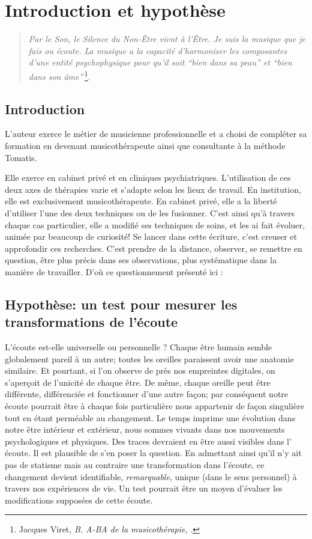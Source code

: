 \chapter{Introduction et hypothèse}
\begin{quotation}
\emph{Par le Son, le Silence du Non-Être vient à l'Être. Je suis
la musique que je fais ou écoute. La musique a la capacité d'harmoniser
les composantes d'une entité psychophysique pour qu'il soit ``bien
dans sa peau'' et ``bien dans son âme''}\,\footnote{Jacques Viret, \emph{B. A-BA de la musicothérapie}, \cite{Viret2007}.}.
\end{quotation}

\section{Introduction}

L'auteur exerce le métier de musicienne professionnelle et a  choisi de compléter sa formation en devenant musicothérapeute  ainsi que consultante à la méthode Tomatis.  



Elle exerce en cabinet privé et en cliniques psychiatriques. L'utilisation de ces deux axes de thérapies varie et s'adapte selon les lieux de travail. En institution, elle est exclusivement musicothérapeute. En cabinet
privé, elle a la liberté d'utiliser l'une des deux techniques ou de les fusionner.
C'est ainsi qu'à travers chaque cas particulier,
elle a modifié ses techniques de soins, et les ai fait évoluer, animée par beaucoup de curiosité! Se lancer dans cette écriture, c'est creuser et approfondir ces recherches. C'est prendre de la distance, observer, se remettre en question, être plus précis dans ses observations, plus systématique dans la manière de travailler. D'où ce questionnement présenté ici : 


\section{Hypothèse: un test pour mesurer les transformations de l'écoute}

L'écoute est-elle universelle ou personnelle ?
 Chaque être humain semble  globalement pareil à un autre; toutes les oreilles paraissent  avoir une anatomie similaire. Et pourtant, si l'on observe de près nos empreintes digitales, on s'aperçoit de l'unicité de chaque être. De même, chaque oreille peut être différente, différenciée et  fonctionner d'une autre façon;  par conséquent notre  écoute pourrait être à chaque fois particulière nous appartenir de façon singulière tout en étant perméable au changement.
Le temps imprime une évolution dans notre être intérieur et extérieur, nous sommes vivants dans nos mouvements psychologiques et physiques. Des traces devraient en être aussi visibles dans l' écoute. Il est plausible de s'en poser la question.
En admettant ainsi qu'il n'y ait pas de statisme mais au contraire une transformation dans l'écoute, ce changement devient identifiable, \textit{remarquable}, unique (dans le sens personnel) à travers nos expériences de vie.  Un test pourrait être un moyen d'évaluer les modifications supposées de cette écoute. 


